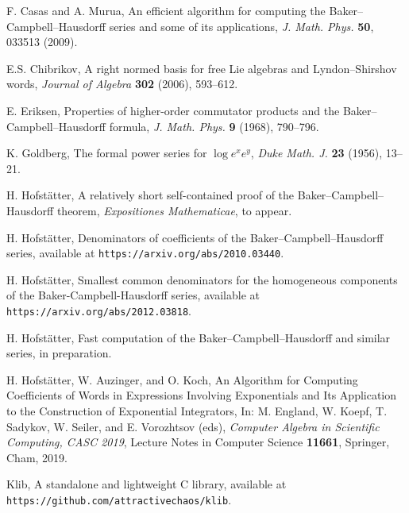 \documentclass[11pt,a4paper]{article}
\begin{document}
\begin{thebibliography}{10}\footnotesize

F. Casas and A. Murua, An efficient algorithm for computing the Baker--Campbell--Hausdorff series
and some of its applications, {\em J. Math. Phys.} {\bf 50}, 033513 (2009).

E.S. Chibrikov, A right normed basis for free Lie algebras and Lyndon--Shirshov
  words, {\em Journal of Algebra} {\bf 302} (2006), 593--612.


 E. Eriksen, Properties of higher-order commutator products and the
    Baker--Campbell--Hausdorff formula, {\em J. Math. Phys.} {\bf 9} (1968), 790--796.

 K. Goldberg, The formal power series for $\log e^x e^y$, {\it Duke Math. J.} {\bf 23} (1956), 13--21.

 H. Hofst\"atter, A relatively short self-contained proof of the Baker--Campbell--Hausdorff theorem, {\it Expositiones Mathematicae}, to appear. %


 H. Hofst\"atter, Denominators of coefficients of the Baker--Campbell--Hausdorff series, available at {\tt https://arxiv.org/abs/2010.03440}.

 H. Hofst\"atter, Smallest common denominators for the homogeneous components of the Baker-Campbell-Hausdorff series, available at {\tt https://arxiv.org/abs/2012.03818}.

 H. Hofst\"atter, Fast computation of the Baker--Campbell--Hausdorff and similar series, in preparation.


 H. Hofstätter, W. Auzinger, and O. Koch,   An Algorithm for Computing Coefficients of Words in Expressions Involving Exponentials and Its Application to the Construction of Exponential Integrators, In: M. England, W. Koepf, T. Sadykov, W. Seiler, and E. Vorozhtsov (eds), {\it Computer Algebra in Scientific Computing, CASC 2019}, Lecture Notes in Computer Science {\bf 11661}, Springer, Cham, 2019. 

  Klib, A standalone and lightweight C library, available at {\tt https://github.com/attractivechaos/klib}.


\end{thebibliography}
\end{document}
